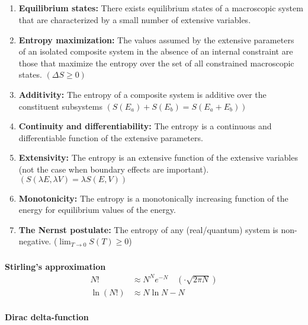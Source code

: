 \documentclass[a4paper, english, 12pt]{article}
\begin{document}
\tiny
\begin{multicols*}{2}


\subsection*{}

\begin{enumerate}
    \item \textbf{Equilibrium states:} There exists equilibrium states of a macroscopic system that are characterized by a small number of extensive variables. 
    \item \textbf{Entropy maximization:} The values assumed by the extensive parameters of an isolated composite system in the absence of an internal constraint are those that maximize the entropy over the set of all constrained macroscopic states. $(\Delta S \geq 0)$
    \item \textbf{Additivity:} The entropy of a composite system is additive over the constituent subsystems $(S(E_a)+S(E_b) = S(E_a+E_b))$
    \item \textbf{Continuity and differentiability:} The entropy is a continuous and differentiable function of the extensive parameters. 
    \item \textbf{Extensivity:} The entropy is an extensive function of the extensive variables (not the case when boundary effects are important). $(S(\lambda E, \lambda V)=\lambda S(E,V))$
    \item \textbf{Monotonicity:} The entropy is a monotonically increasing function of the energy for equilibrium values of the energy. 
    \item \textbf{The Nernst postulate:} The entropy of any (real/quantum) system is non-negative. ($\lim_{T\to0} S(T)\geq0$)
\end{enumerate}


\subsubsection*{}
\textbf{Stirling's approximation}
\begin{align*}
  N! &\approx N^Ne^{-N}\quad(\cdot \sqrt{2\pi N}) \\
  \ln{(N!)} &\approx N\ln{N}-N \\
\end{align*}

\textbf{Dirac delta-function}


\end{multicols*}
\end{document}
